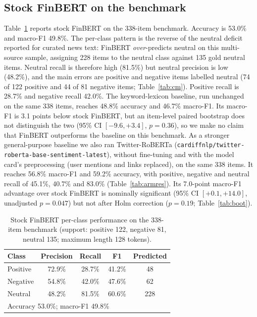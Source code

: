\documentclass{aims}
\numberwithin{equation}{section}
\begin{document}
\subsection{Stock FinBERT on the benchmark}
Table~\ref{tab:stock} reports stock FinBERT on the 338-item benchmark. Accuracy is
53.0\% and macro-F1 49.8\%. The per-class pattern is the reverse of the neutral
deficit reported for curated news text: FinBERT \emph{over}-predicts neutral on this
multi-source sample, assigning 228 items to the neutral class against 135 gold
neutral items. Neutral recall is therefore high (81.5\%) but neutral precision is
low (48.2\%), and the main errors are positive and negative items labelled neutral
(74 of 122 positive and 44 of 81 negative items; Table~\ref{tab:cm}). Positive
recall is 28.7\% and negative recall 42.0\%.
The keyword-lexicon baseline, run unchanged on the same 338 items, reaches 48.8\%
accuracy and 46.7\% macro-F1. Its macro-F1 is 3.1 points below stock FinBERT, but an
item-level paired bootstrap does not distinguish the two (95\% CI $[-9.6, +3.4]$,
$p = 0.36$), so we make no claim that FinBERT outperforms the baseline on this
benchmark.
As a stronger general-purpose baseline we also ran Twitter-RoBERTa
(\texttt{cardiffnlp/twitter-roberta-base-sentiment-latest}), without fine-tuning and
with the model card's preprocessing (user mentions and links replaced), on the same
338 items. It reaches 56.8\% macro-F1 and 59.2\% accuracy, with positive, negative and
neutral recall of 45.1\%, 40.7\% and 83.0\% (Table~\ref{tab:armres}). Its 7.0-point
macro-F1 advantage over stock FinBERT is nominally significant (95\% CI $[+0.1, +14.0]$,
unadjusted $p = 0.047$) but not after Holm correction ($p = 0.19$; Table~\ref{tab:boot}).

\begin{table}[ht]
\centering
\caption{Stock FinBERT per-class performance on the 338-item benchmark (support:
positive 122, negative 81, neutral 135; maximum length 128 tokens).}
\label{tab:stock}
\begin{tabular}{lcccc}
\toprule
\textbf{Class} & \textbf{Precision} & \textbf{Recall} & \textbf{F1} & \textbf{Predicted} \\
\midrule
Positive & 72.9\% & 28.7\% & 41.2\% & 48 \\
Negative & 54.8\% & 42.0\% & 47.6\% & 62 \\
Neutral  & 48.2\% & 81.5\% & 60.6\% & 228 \\
\midrule
\multicolumn{5}{l}{Accuracy 53.0\%; macro-F1 49.8\%} \\
\bottomrule
\end{tabular}
\end{table}
\end{document}
